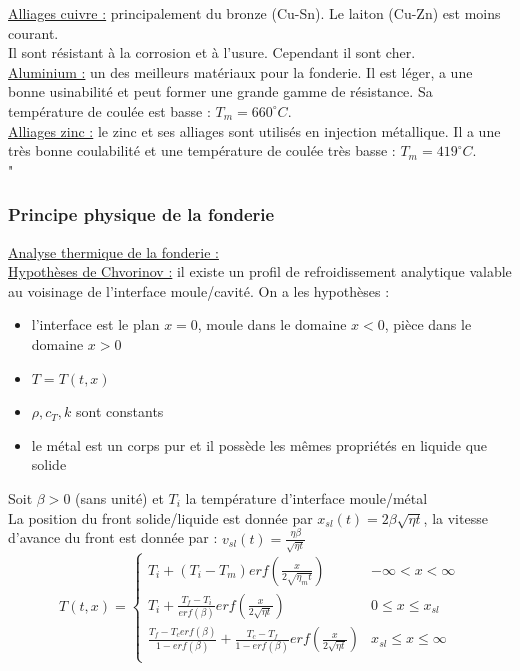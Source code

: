 \documentclass[../main.tex]{subfiles}
\begin{document}
\quad \underline{Alliages cuivre :} principalement du bronze (Cu-Sn). Le laiton (Cu-Zn) est moins courant.\\
Il sont résistant à la corrosion et à l'usure. Cependant il sont cher.\\

\quad \underline{Aluminium :} un des meilleurs matériaux pour la fonderie. Il est léger, a une bonne usinabilité et peut former une grande gamme de résistance. Sa température de coulée est basse : $T_m = 660^\circ C$.\\

\quad \underline{Alliages zinc :} le zinc et ses alliages sont utilisés en injection métallique. Il a une très bonne coulabilité et une température de coulée très basse : $T_m = 419^\circ C$.\\"

\subsubsection{Principe physique de la fonderie}
\quad \underline{Analyse thermique de la fonderie :}\\
\underline{Hypothèses de Chvorinov :} il existe un profil de refroidissement analytique valable au voisinage de l'interface moule/cavité. On a les hypothèses :\begin{itemize}
    \item l'interface est le plan $x=0$, moule dans le domaine $x<0$, pièce dans le domaine $x>0$\\
    \item $T=T(t,x)$\\
    \item $\rho, c_T,k$ sont constants\\
    \item le métal est un corps pur et il possède les mêmes propriétés en liquide que solide\\
\end{itemize}

Soit $\beta>0$ (sans unité) et $T_i$ la température d'interface moule/métal\\
La position du front solide/liquide est donnée par $x_{sl}(t) = 2\beta \sqrt{\eta t}$, la vitesse d'avance du front est donnée par : $v_{sl}(t) = \frac{\eta \beta}{\sqrt{\eta t}}$\\

\begin{equation}
    T(t,x) = \begin{cases}
        T_i + (T_i-T_m) erf(\frac{x}{2\sqrt{\eta_m t}}) & -\infty<x<\infty\\
        T_i + \frac{T_f-T_i}{erf(\beta)}erf(\frac{x}{2\sqrt{\eta t}}) & 0\leq x\leq x_{sl}\\
        \frac{T_f-T_c erf(\beta)}{1-erf(\beta)}+\frac{T_c-T_f}{1-erf(\beta)}erf(\frac{x}{2\sqrt{\eta t}}) &x_{sl} \leq x \leq \infty\\
    \end{cases}
\end{equation}
\end{document}

